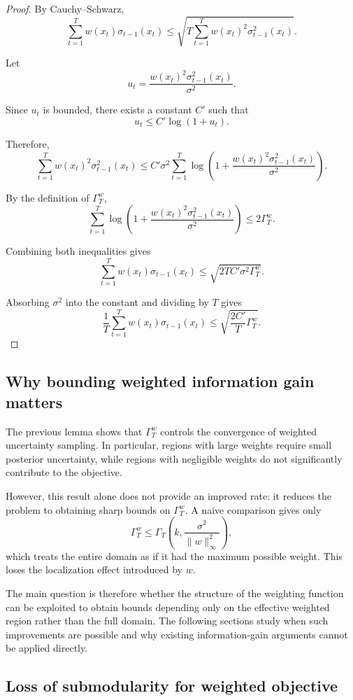 \begin{proof}
By Cauchy--Schwarz,
$$
\sum_{t=1}^T w(x_t)\sigma_{t-1}(x_t)
\leq
\sqrt{
T
\sum_{t=1}^T
w(x_t)^2\sigma_{t-1}^2(x_t)
}.
$$

Let
$$
u_t=
\frac{
w(x_t)^2\sigma_{t-1}^2(x_t)
}{
\sigma^2
}.
$$

Since $u_t$ is bounded, there exists a constant $C'$ such that
$$
u_t\leq C'\log(1+u_t).
$$

Therefore,
$$
\sum_{t=1}^T
w(x_t)^2\sigma_{t-1}^2(x_t)
\leq
C'\sigma^2
\sum_{t=1}^T
\log\left(
1+
\frac{
w(x_t)^2\sigma_{t-1}^2(x_t)
}{
\sigma^2
}
\right).
$$

By the definition of $\Gamma_T^w$,
$$
\sum_{t=1}^T
\log\left(
1+
\frac{
w(x_t)^2\sigma_{t-1}^2(x_t)
}{
\sigma^2
}
\right)
\leq
2\Gamma_T^w .
$$

Combining both inequalities gives
$$
\sum_{t=1}^T w(x_t)\sigma_{t-1}(x_t)
\leq
\sqrt{
2TC'\sigma^2\Gamma_T^w
}.
$$

Absorbing $\sigma^2$ into the constant and dividing by $T$ gives
$$
\frac{1}{T}
\sum_{t=1}^T w(x_t)\sigma_{t-1}(x_t)
\leq
\sqrt{
\frac{2C'}{T}\Gamma_T^w
}.
$$
\end{proof}

\subsection{Why bounding weighted information gain matters}

The previous lemma shows that $\Gamma_T^w$ controls the convergence of
weighted uncertainty sampling. In particular, regions with large weights
require small posterior uncertainty, while regions with negligible weights
do not significantly contribute to the objective.

However, this result alone does not provide an improved rate: it reduces the
problem to obtaining sharp bounds on $\Gamma_T^w$. A naive comparison gives
only
$$
\Gamma_T^w
\leq
\Gamma_T\left(k,\frac{\sigma^2}{\|w\|_\infty^2}\right),
$$
which treats the entire domain as if it had the maximum possible weight.
This loses the localization effect introduced by $w$.

The main question is therefore whether the structure of the weighting
function can be exploited to obtain bounds depending only on the effective
weighted region rather than the full domain. The following sections study
when such improvements are possible and why existing information-gain
arguments cannot be applied directly.

\subsection{Loss of submodularity for weighted objective}

